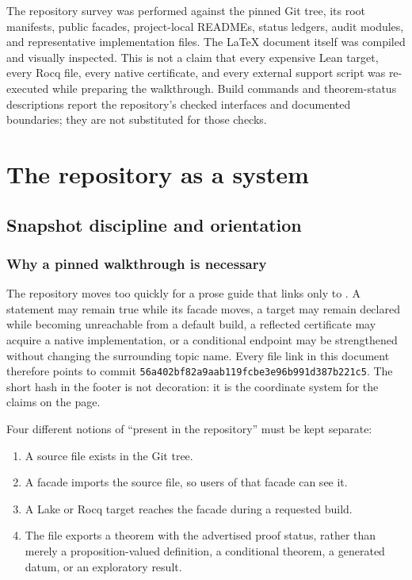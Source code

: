 \documentclass[
  10pt,
  a4paper,
  twoside,
  open=any,
  parskip=half,
  headings=big
]{scrreprt}
\newcommand{\CommitFull}{56a402bf82a9aab119fcbe3e96b991d387b221c5}
\newcommand{\code}[1]{\texttt{\detokenize{#1}}}
\begin{document}
\begin{boundarybox}
The repository survey was performed against the pinned Git tree, its root manifests, public facades, project-local READMEs, status ledgers, audit modules, and representative implementation files. The LaTeX document itself was compiled and visually inspected. This is not a claim that every expensive Lean target, every Rocq file, every native certificate, and every external support script was re-executed while preparing the walkthrough. Build commands and theorem-status descriptions report the repository's checked interfaces and documented boundaries; they are not substituted for those checks.
\end{boundarybox}

\tableofcontents
\listoftables
\clearpage

\part{The repository as a system}

\chapter{Snapshot discipline and orientation}
\label{ch:orientation}

\section{Why a pinned walkthrough is necessary}

The repository moves too quickly for a prose guide that links only to \code{main}. A statement may remain true while its facade moves, a target may remain declared while becoming unreachable from a default build, a reflected certificate may acquire a native implementation, or a conditional endpoint may be strengthened without changing the surrounding topic name. Every file link in this document therefore points to commit \texttt{\CommitFull}. The short hash in the footer is not decoration: it is the coordinate system for the claims on the page.

Four different notions of ``present in the repository'' must be kept separate:

\begin{enumerate}
  \item A source file exists in the Git tree.
  \item A facade imports the source file, so users of that facade can see it.
  \item A Lake or Rocq target reaches the facade during a requested build.
  \item The file exports a theorem with the advertised proof status, rather than merely a proposition-valued definition, a conditional theorem, a generated datum, or an exploratory result.
\end{enumerate}
\end{document}
